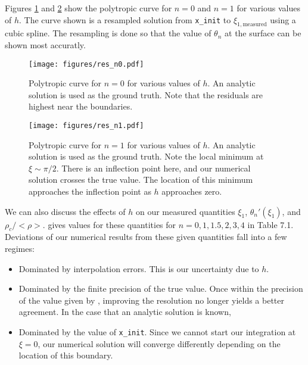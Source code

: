 \documentclass[twocolumn]{aastex631}
\begin{document}
Figures \ref{fig:res_n0} and \ref{fig:res_n1} show the
polytropic curve for $n=0$ and $n=1$ for various
values of $h$. The curve shown is a resampled solution from
\texttt{x\_init} to $\xi_{1,\text{measured}}$ using a cubic spline.
The resampling is done so that the value of $\theta_n$ at
the surface can be shown most accuratly.



\begin{figure}[h]
    \begin{centering}
        \texttt{[image: figures/res\_n0.pdf]}
        \caption{Polytropic curve for $n=0$ for various
        values of $h$. An analytic solution is used as
        the ground truth. Note that the residuals are highest
        near the boundaries.}
        \label{fig:res_n0}
    \end{centering}
\end{figure}

\begin{figure}[h]
    \begin{centering}
        \texttt{[image: figures/res\_n1.pdf]}
        \caption{Polytropic curve for $n=1$ for various
        values of $h$. An analytic solution is used as
        the ground truth. Note the local minimum at
        $\xi\sim \pi/2$. There is an inflection point here,
        and our numerical solution crosses the true value.
        The location of this minimum approaches the inflection
        point as $h$ approaches zero.}
        \label{fig:res_n1}
    \end{centering}
\end{figure}

We can also discuss the effects of $h$ on our measured quantities
$\xi_1$, $\theta_n'(\xi_1)$, and $\rho_c/<\rho>$. \citet{textbook}
gives values for these quantities for $n=0,1,1.5,2,3,4$ in Table 7.1.
Deviations of our numerical results from these given quantities fall
into a few regimes:

\begin{itemize}
    \item Dominated by interpolation errors. This is our uncertainty
    due to $h$.
    \item Dominated by the finite precision of the true value. Once
    within the precision of the value given by \citet{textbook},
    improving the resolution no longer yields a better agreement.
    In the case that an analytic solution is known, 
    \item Dominated by the value of \texttt{x\_init}. Since we
    cannot start our integration at $\xi=0$, our numerical solution
    will converge differently depending on the location of this boundary.
\end{itemize}
\end{document}
